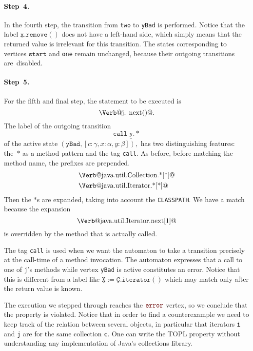 \documentclass{sigplanconf} %
\makeatletter
\newcommand{\error}{\ensuremath{\textcolor{darkred}{\mathtt{error}}}\xspace}
\newcommand{\pattern}[1]{\ensuremath{\mathtt{\underline{#1}}}}
\newcommand{\start}{\ensuremath{\mathtt{start}}\xspace}
\newcommand{\verbline}[2][]{\[\text{\Verb@#2@}#1\]}
\theoremstyle{definition}
\theoremstyle{remark}
\makeatother
\begin{document}
\paragraph{Step~4.}

In the fourth step, the transition from \texttt{two} to \texttt{yBad} is performed.
Notice that the label $\pattern{x}.\mathtt{remove}()$ does not have a left-hand side, which simply means that the returned value is irrelevant for this transition.
The states corresponding to vertices \start and {\tt one} remain unchanged, because their outgoing transitions are~disabled.

\paragraph{Step~5.}

For the fifth and final step, the statement to be executed is \verbline[.]{j.\PY{n+na}{next}()}
The label of the outgoing transition  \[\mathtt{call}\;\pattern{y}.{*}\] of the active state $(\texttt{yBad},[c:\gamma,x:\alpha,y:\beta]),$
has two distinguishing features: the~$*$ as a method pattern and the tag \texttt{call}.
As before, before matching the method name, the prefixes are prepended.
\begin{align*}
&\text{\Verb@java.util.Collection.*[*]@} \\
&\text{\Verb@java.util.Iterator.*[*]@}
\end{align*}
Then the $*$s are expanded, taking into account the \texttt{CLASSPATH}.
We have a match because the expansion \verbline{java.util.Iterator.next[1]} is overridden by the method that is actually called.

The tag {\tt call} is used when we want the automaton to take a transition precisely at the call-time of a method invocation.
The automaton expresses that a call to one of {\tt j}'s methods while vertex \texttt{yBad} is active constitutes an error.
Notice that this is different from a label like $\pattern X:=\pattern C.\mathtt{iterator}()$ which may match only after the return value is known.

\medskip
The execution we stepped through reaches the \error vertex, so we conclude that the property is violated.
Notice that in order to find a counterexample we need to keep track of the relation between several objects, in particular that iterators {\tt i} and {\tt j} are for the same collection {\tt c}.
One can write the TOPL property without understanding any implementation of Java's collections library.
\end{document}

